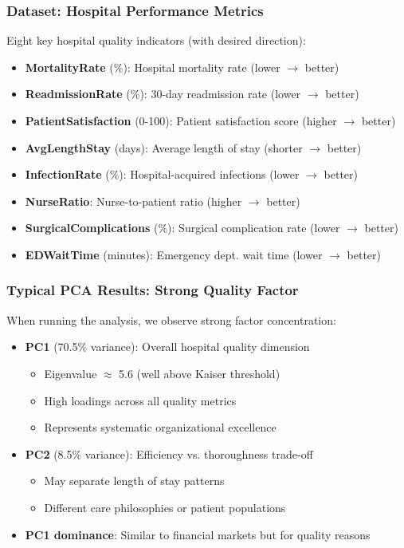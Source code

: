 \documentclass[aspectratio=169]{beamer}
\begin{document}
\begin{frame}
    \frametitle{Dataset: Hospital Performance Metrics}
    Eight key hospital quality indicators (with desired direction):
    \begin{itemize}
        \item \textbf{MortalityRate} (\%): Hospital mortality rate (lower $\rightarrow$ better) \pause
        \item \textbf{ReadmissionRate} (\%): 30-day readmission rate (lower $\rightarrow$ better) \pause
        \item \textbf{PatientSatisfaction} (0-100): Patient satisfaction score (higher $\rightarrow$ better) \pause
        \item \textbf{AvgLengthStay} (days): Average length of stay (shorter $\rightarrow$ better) \pause
        \item \textbf{InfectionRate} (\%): Hospital-acquired infections (lower $\rightarrow$ better) \pause
        \item \textbf{NurseRatio}: Nurse-to-patient ratio (higher $\rightarrow$ better) \pause
        \item \textbf{SurgicalComplications} (\%): Surgical complication rate (lower $\rightarrow$ better) \pause
        \item \textbf{EDWaitTime} (minutes): Emergency dept. wait time (lower $\rightarrow$ better) \pause
    \end{itemize}
\end{frame}

\begin{frame}
    \frametitle{Typical PCA Results: Strong Quality Factor}
    When running the analysis, we observe strong factor concentration:
    \begin{itemize}
        \item \textbf{PC1} (70.5\% variance): Overall hospital quality dimension \pause
              \begin{itemize}
                  \item Eigenvalue $\approx$ 5.6 (well above Kaiser threshold) \pause
                  \item High loadings across all quality metrics \pause
                  \item Represents systematic organizational excellence \pause
              \end{itemize}
        \item \textbf{PC2} (8.5\% variance): Efficiency vs. thoroughness trade-off \pause
              \begin{itemize}
                  \item May separate length of stay patterns \pause
                  \item Different care philosophies or patient populations \pause
              \end{itemize}
        \item \textbf{PC1 dominance}: Similar to financial markets but for quality reasons \pause
    \end{itemize}
\end{frame}
\end{document}

